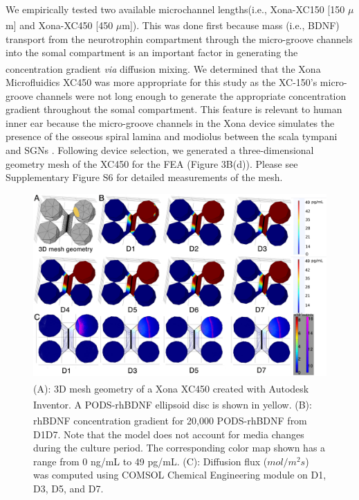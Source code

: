 \documentclass[review]{elsarticle}
\begin{document}
\indent We empirically tested two available microchannel lengths\textemdash (i.e., Xona\textsuperscript{\texttrademark}-XC150 [150 $\mu$m] and Xona\textsuperscript{\texttrademark}-XC450 [450 $\mu$m]). This was done first because mass (i.e., BDNF) transport from the neurotrophin compartment through the micro-groove channels into the somal compartment is an important factor in generating the concentration gradient \textit{via} diffusion mixing.  We determined that the Xona\textsuperscript{\texttrademark} Microfluidics XC450 was more appropriate for this study as the XC-150's micro-groove channels were not long enough to generate the appropriate concentration gradient throughout the somal compartment. This feature is relevant to human inner ear because the micro-groove channels in the Xona device simulates the presence of the osseous spiral lamina and modiolus between the scala tympani and SGNs  \cite{Tuncel2005,Kucuk1991a}. Following device selection, we generated a three-dimensional geometry mesh of the XC450 for the FEA (Figure 3B(d)). Please see Supplementary Figure S6 for detailed measurements of the mesh. 

\begin{figure}
\begin{center}
	\includegraphics[width=13cm]{Fig_6.jpg}
\end{center}
\caption{(A): 3D mesh geometry of a Xona\textsuperscript{\texttrademark} XC450 created with Autodesk Inventor. A PODS\textsuperscript{\textregistered}-rhBDNF ellipsoid disc is shown in yellow. (B): rhBDNF concentration gradient for 20,000 PODS\textsuperscript{\textregistered}-rhBDNF from D1\textendash D7. Note that the model does not account for media changes during the culture period. The corresponding color map shown has a range from 0 ng/mL to 49 pg/mL. (C): Diffusion flux ($mol/m^{2}s$) was computed using COMSOL Chemical Engineering module on D1, D3, D5, and D7.}
\end{figure}
\end{document}
